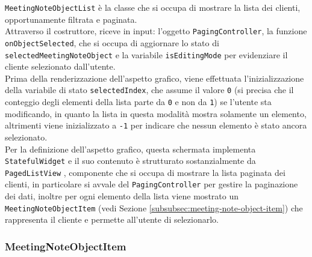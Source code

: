\lstinline{MeetingNoteObjectList} è la classe che si occupa di mostrare la lista dei clienti, opportunamente filtrata e paginata. \\
Attraverso il costruttore, riceve in input: l'oggetto \lstinline{PagingController}, la funzione \lstinline{onObjectSelected}, che si occupa di aggiornare lo stato di \lstinline{selectedMeetingNoteObject} e la variabile \lstinline{isEditingMode} per evidenziare il cliente selezionato dall'utente. \\
Prima della renderizzazione dell'aspetto grafico, viene effettuata l'inizializzazione della variabile di stato \lstinline{selectedIndex}, che assume il valore \lstinline{0} (si precisa che il conteggio degli elementi della lista parte da \lstinline{0} e non da \lstinline{1}) se l'utente sta modificando, in quanto la lista in questa modalità mostra solamente un elemento, altrimenti viene inizializzato a \lstinline{-1} per indicare che nessun elemento è stato ancora selezionato. \\
Per la definizione dell'aspetto grafico, questa schermata implementa \lstinline{StatefulWidget} e il suo contenuto è strutturato sostanzialmente da \lstinline{PagedListView} \cite{site:infinite-scroll-pagination}, componente che si occupa di mostrare la lista paginata dei clienti, in particolare si avvale del \lstinline{PagingController} per gestire la paginazione dei dati, inoltre per ogni elemento della lista viene mostrato un \lstinline{MeetingNoteObjectItem} (vedi Sezione \ref{subsubsec:meeting-note-object-item}) che rappresenta il cliente e permette all'utente di selezionarlo.

\subsubsection*{MeetingNoteObjectItem}
\label{subsubsec:meeting-note-object-item}

